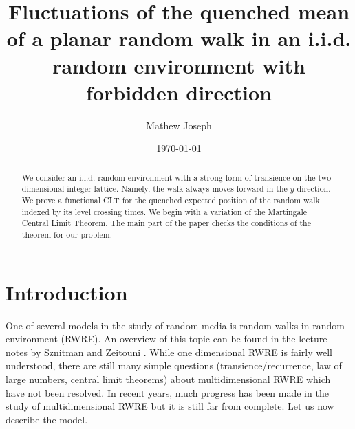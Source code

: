 \documentclass[11pt]{amsart}
\begin{document}
\title[Fluctuations of quenched mean]{ Fluctuations of the quenched mean of a planar random walk in an i.i.d. random environment with forbidden direction}
\author[M.~Joseph]{Mathew Joseph}
\address{Mathew Joseph\\ University of Wisconsin-Madison\\ 
Mathematics Department\\ Van Vleck Hall\\ 480 Lincoln Dr.\\  
Madison WI 53706-1388\\ USA.}
\date{\today}
\begin{abstract}
We consider an i.i.d. random environment with a strong form of transience on the two dimensional integer lattice. Namely, the walk always moves forward in the $y$-direction. We prove a functional CLT for the quenched expected position of the random walk indexed by its level crossing times. We begin with a variation of the Martingale Central Limit Theorem. The main part of the paper checks the conditions of the theorem for our problem.
\end{abstract}
\maketitle

 

\section{Introduction}
One of several models in the study of random media is random walks in random environment (RWRE). An overview of this topic can be found in the lecture notes by Sznitman \cite{szn} and Zeitouni \cite{zet}. While one dimensional RWRE is fairly well understood, there are still many simple questions (transience/recurrence, law of large numbers, central limit theorems) about multidimensional RWRE which have not been resolved. In recent years, much progress has been made in the study of multidimensional RWRE but it is still far from complete. Let us now describe the model.
\end{document}
